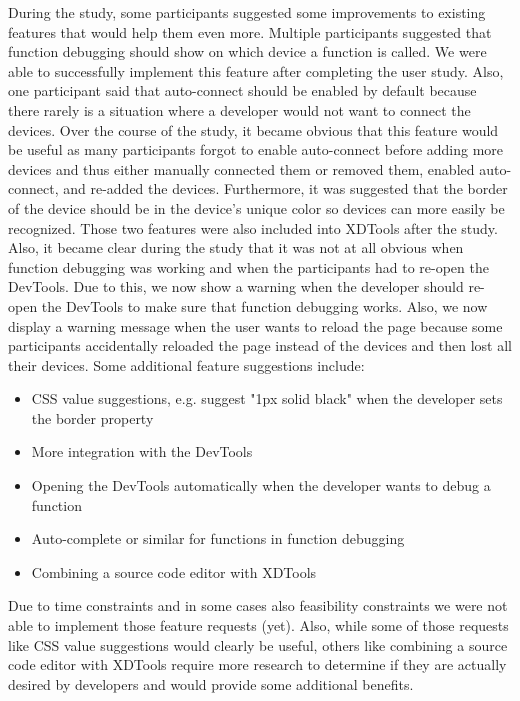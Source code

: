 During the study, some participants suggested some improvements to existing features that would help them even more. Multiple participants suggested that function debugging should show on which device a function is called. We were able to successfully implement this feature after completing the user study. Also, one participant said that auto-connect should be enabled by default because there rarely is a situation where a developer would not want to connect the devices. Over the course of the study, it became obvious that this feature would be useful as many participants forgot to enable auto-connect before adding more devices and thus either manually connected them or removed them, enabled auto-connect, and re-added the devices. Furthermore, it was suggested that the border of the device should be in the device's unique color so devices can more easily be recognized. Those two features were also included into XDTools after the study. Also, it became clear during the study that it was not at all obvious when function debugging was working and when the participants had to re-open the DevTools. Due to this, we now show a warning when the developer should re-open the DevTools to make sure that function debugging works. Also, we now display a warning message when the user wants to reload the page because some participants accidentally reloaded the page instead of the devices and then lost all their devices. Some additional feature suggestions include:
\begin{itemize}
	\item CSS value suggestions, e.g. suggest "1px solid black" when the developer sets the border property
	\item More integration with the DevTools
	\item Opening the DevTools automatically when the developer wants to debug a function
	\item Auto-complete or similar for functions in function debugging
	\item Combining a source code editor with XDTools
\end{itemize}
Due to time constraints and in some cases also feasibility constraints we were not able to implement those feature requests (yet). Also, while some of those requests like CSS value suggestions would clearly be useful, others like combining a source code editor with XDTools require more research to determine if they are actually desired by developers and would provide some additional benefits.